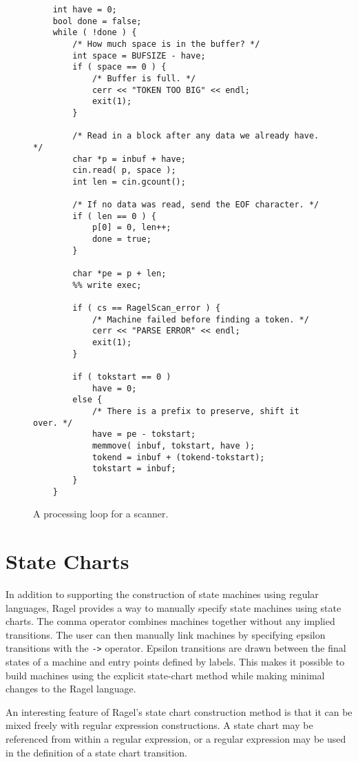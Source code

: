 \documentclass[letterpaper,11pt,oneside]{book}
\begin{document}
\begin{figure}
\small
\begin{verbatim}
    int have = 0;
    bool done = false;
    while ( !done ) {
        /* How much space is in the buffer? */
        int space = BUFSIZE - have;
        if ( space == 0 ) {
            /* Buffer is full. */
            cerr << "TOKEN TOO BIG" << endl;
            exit(1);
        }

        /* Read in a block after any data we already have. */
        char *p = inbuf + have;
        cin.read( p, space );
        int len = cin.gcount();

        /* If no data was read, send the EOF character. */
        if ( len == 0 ) {
            p[0] = 0, len++;
            done = true;
        }

        char *pe = p + len;
        %% write exec;

        if ( cs == RagelScan_error ) {
            /* Machine failed before finding a token. */
            cerr << "PARSE ERROR" << endl;
            exit(1);
        }

        if ( tokstart == 0 )
            have = 0;
        else {
            /* There is a prefix to preserve, shift it over. */
            have = pe - tokstart;
            memmove( inbuf, tokstart, have );
            tokend = inbuf + (tokend-tokstart);
            tokstart = inbuf;
        }
    }
\end{verbatim}
\caption{A processing loop for a scanner.}
\label{scanner-loop}
\end{figure}

\section{State Charts}

In addition to supporting the construction of state machines using regular
languages, Ragel provides a way to manually specify state machines using
state charts.  The comma operator combines machines together without any
implied transitions. The user can then manually link machines by specifying
epsilon transitions with the \verb|->| operator.  Epsilon transitions are drawn
between the final states of a machine and entry points defined by labels.  This
makes it possible to build machines using the explicit state-chart method while
making minimal changes to the Ragel language. 

An interesting feature of Ragel's state chart construction method is that it
can be mixed freely with regular expression constructions. A state chart may be
referenced from within a regular expression, or a regular expression may be
used in the definition of a state chart transition.
\end{document}
